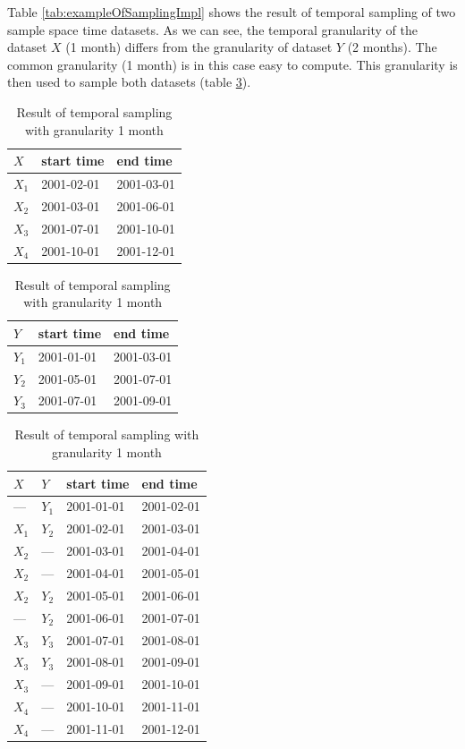 \documentclass[a4paper,12pt,oneside]{book}
\begin{document}
Table \ref{tab:exampleOfSamplingImpl} shows the result of temporal sampling of two sample space time datasets.
As we can see, the temporal granularity of the dataset $X$ (1 month) differs from the granularity of dataset $Y$ (2 months).
The common granularity (1 month) is in this case easy to compute.
This granularity is then used to sample both datasets (table \ref{tab:exampleOfSamplingImpl-2}).


\begin{table}
 \centering
\caption{Example of two space time datasets $X$ and $Y$ and the their sampling by temporal granularity 1 month.}
\label{tab:exampleOfSamplingImpl}
\begin{subtable}{0.4\textwidth}
    \centering
    \caption{List of maps and valid time intervals}
    \begin{tabular}{lll}
    \toprule
    $X$ & start time & end time \\
    \midrule
    $X_1$ & 2001-02-01 & 2001-03-01\\
    $X_2$ & 2001-03-01 & 2001-06-01\\
    $X_3$ & 2001-07-01 & 2001-10-01\\
    $X_4$ & 2001-10-01 & 2001-12-01\\
    \bottomrule
    \end{tabular}

    \vspace{20pt}
    \begin{tabular}{lll}
    \toprule
    $Y$ & start time & end time \\
    \midrule
    $Y_1$ & 2001-01-01 & 2001-03-01\\
    $Y_2$ & 2001-05-01 & 2001-07-01\\
    $Y_3$ & 2001-07-01 & 2001-09-01\\
    \bottomrule
    \end{tabular}
\end{subtable}
\quad
\begin{subtable}{0.4\textwidth}
\centering
\caption{Result of temporal sampling with granularity 1 month}
\label{tab:exampleOfSamplingImpl-2}
\begin{tabular}{llll}
\toprule
 $X$ & $Y$ & start time & end time \\\midrule
--- & $Y_1$ & 2001-01-01 & 2001-02-01\\
$X_1$& $Y_2$ & 2001-02-01 & 2001-03-01\\
$X_2$& --- & 2001-03-01 & 2001-04-01\\
$X_2$& --- & 2001-04-01 & 2001-05-01\\
$X_2$& $Y_2$ & 2001-05-01 & 2001-06-01\\
--- & $Y_2$ & 2001-06-01 & 2001-07-01\\
$X_3$& $Y_3$ & 2001-07-01 & 2001-08-01\\
$X_3$ &$Y_3$ & 2001-08-01 & 2001-09-01\\
$X_3$ & --- & 2001-09-01 & 2001-10-01\\
$X_4$& --- & 2001-10-01 & 2001-11-01\\
$X_4$ & --- & 2001-11-01 & 2001-12-01\\
\bottomrule
\end{tabular}
\end{subtable}


\end{table}
\end{document}

